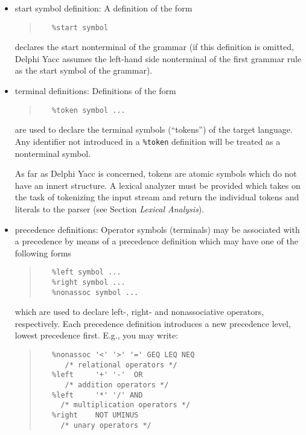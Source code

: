 \documentclass{article}
\begin{document}
\begin{itemize}
   \item
      start symbol definition: A definition of the form
      \begin{quote}\begin{verbatim}
   %start symbol
      \end{verbatim}\end{quote}
      declares the start nonterminal of the grammar (if this definition is
      omitted, Delphi Yacc assumes the left-hand side nonterminal of the first
      grammar rule as the start symbol of the grammar).
   \item
      terminal definitions: Definitions of the form
      \begin{quote}\begin{verbatim}
   %token symbol ...
      \end{verbatim}\end{quote}
      are used to declare the terminal symbols (``tokens'') of the target
      language. Any identifier not introduced in a \verb"%token" definition
      will be treated as a nonterminal symbol.
    
      As far as Delphi Yacc is concerned, tokens are atomic symbols which do not
      have an innert structure. A lexical analyzer must be provided which
      takes on the task of tokenizing the input stream and return the
      individual tokens and literals to the parser (see Section {\em Lexical
      Analysis\/}).
   \item
      precedence definitions: Operator symbols (terminals) may be associated
      with a precedence by means of a precedence definition which may have
      one of the following forms
      \begin{quote}\begin{verbatim}
   %left symbol ...
   %right symbol ...
   %nonassoc symbol ...
      \end{verbatim}\end{quote}
      which are used to declare left-, right- and nonassociative operators,
      respectively. Each precedence definition introduces a new precedence
      level, lowest precedence first. E.g., you may write:
      \begin{quote}\begin{verbatim}
   %nonassoc '<' '>' '=' GEQ LEQ NEQ
      /* relational operators */
   %left     '+' '-'  OR
      /* addition operators */
   %left     '*' '/' AND
     /* multiplication operators */
   %right    NOT UMINUS
     /* unary operators */
      \end{verbatim}\end{quote}


\end{itemize}
\end{document}
